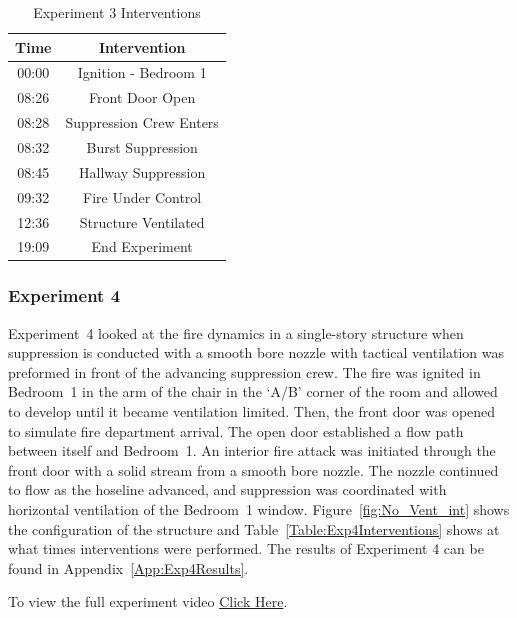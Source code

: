 \documentclass[12pt,oneside]{book}
\begin{document}
\begin{table}[!ht]
	\centering
	\caption{Experiment 3 Interventions}
	\begin{tabular}{|c|c|} 
		\hline
		Time & Intervention \\ \hline \hline
		00:00 & Ignition - Bedroom 1 \\ \hline
		08:26 & Front Door Open \\ \hline
		08:28 & Suppression Crew Enters\\ \hline
		08:32 & Burst Suppression \\ \hline 
		08:45 & Hallway Suppression \\ \hline
		09:32 & Fire Under Control \\ \hline
		12:36 & Structure Ventilated \\ \hline
		19:09 & End Experiment\\ \hline
	\end{tabular}
	\label{Table:Exp3Interventions}
\end{table}

\FloatBarrier
\clearpage

\subsubsection{Experiment 4}
Experiment~4 looked at the fire dynamics in a single-story structure when suppression is conducted with a smooth bore nozzle with tactical ventilation was preformed in front of the advancing suppression crew. The fire was ignited in Bedroom~1 in the arm of the chair in the `A/B' corner of the room and allowed to develop until it became ventilation limited. Then, the front door was opened to simulate fire department arrival. The open door established a flow path between itself and Bedroom~1. An interior fire attack was initiated through the front door with a solid stream from a smooth bore nozzle. The nozzle continued to flow as the hoseline advanced, and suppression was coordinated with horizontal ventilation of the Bedroom~1 window. Figure~\ref{fig:No_Vent_int} shows the configuration of the structure and Table~\ref{Table:Exp4Interventions} shows at what times interventions were performed. The results of Experiment 4 can be found in Appendix~\ref{App:Exp4Results}. 

To view the full experiment video \href{https://player.vimeo.com/video/170499609?autoplay=1}{Click Here}.
\end{document}
